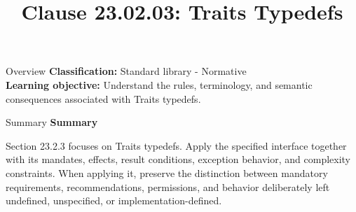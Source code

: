 \documentclass[10pt,letterpaper]{article}
\title{Clause 23.02.03: Traits Typedefs}
\author{}
\date{}
\begin{document}
\maketitle
\begin{CornellOverviewBox}{Overview}
\textbf{Classification:} Standard library - Normative\\[2pt]
\textbf{Learning objective:} Understand the rules, terminology, and semantic consequences associated with Traits typedefs.
\end{CornellOverviewBox}\begin{CornellSummaryBox}{Summary}
{\sffamily\bfseries\color{Accent} Summary}\par\vspace{3pt}Section 23.2.3 focuses on Traits typedefs. Apply the specified interface together with its mandates, effects, result conditions, exception behavior, and complexity constraints. When applying it, preserve the distinction between mandatory requirements, recommendations, permissions, and behavior deliberately left undefined, unspecified, or implementation-defined.
\end{CornellSummaryBox}
\end{document}
